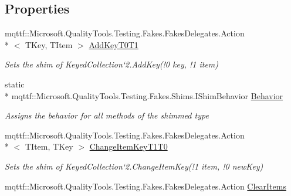 \subsection*{Properties}
\begin{DoxyCompactItemize}
\item 
mqttf\-::\-Microsoft.\-Quality\-Tools.\-Testing.\-Fakes.\-Fakes\-Delegates.\-Action\\*
$<$ T\-Key, T\-Item $>$ \hyperlink{class_system_1_1_collections_1_1_object_model_1_1_fakes_1_1_shim_keyed_collection_3_01_t_key_00_01_t_item_01_4_a2baf4d8d1c059061319c1bc2c2ed00de}{Add\-Key\-T0\-T1}
\begin{DoxyCompactList}\small\item\em Sets the shim of Keyed\-Collection`2.Add\-Key(!0 key, !1 item)\end{DoxyCompactList}\item 
static \\*
mqttf\-::\-Microsoft.\-Quality\-Tools.\-Testing.\-Fakes.\-Shims.\-I\-Shim\-Behavior \hyperlink{class_system_1_1_collections_1_1_object_model_1_1_fakes_1_1_shim_keyed_collection_3_01_t_key_00_01_t_item_01_4_a29dfe9dc8b60971fcb47fb3dd01014a3}{Behavior}
\begin{DoxyCompactList}\small\item\em Assigns the behavior for all methods of the shimmed type\end{DoxyCompactList}\item 
mqttf\-::\-Microsoft.\-Quality\-Tools.\-Testing.\-Fakes.\-Fakes\-Delegates.\-Action\\*
$<$ T\-Item, T\-Key $>$ \hyperlink{class_system_1_1_collections_1_1_object_model_1_1_fakes_1_1_shim_keyed_collection_3_01_t_key_00_01_t_item_01_4_ae8e0fd0cfdadd034cc9defd26ee9e9b0}{Change\-Item\-Key\-T1\-T0}
\begin{DoxyCompactList}\small\item\em Sets the shim of Keyed\-Collection`2.Change\-Item\-Key(!1 item, !0 new\-Key)\end{DoxyCompactList}\item 
mqttf\-::\-Microsoft.\-Quality\-Tools.\-Testing.\-Fakes.\-Fakes\-Delegates.\-Action \hyperlink{class_system_1_1_collections_1_1_object_model_1_1_fakes_1_1_shim_keyed_collection_3_01_t_key_00_01_t_item_01_4_ae47c122bb5dbf14a2db7866c775ede1f}{Clear\-Items}

\end{DoxyCompactItemize}

